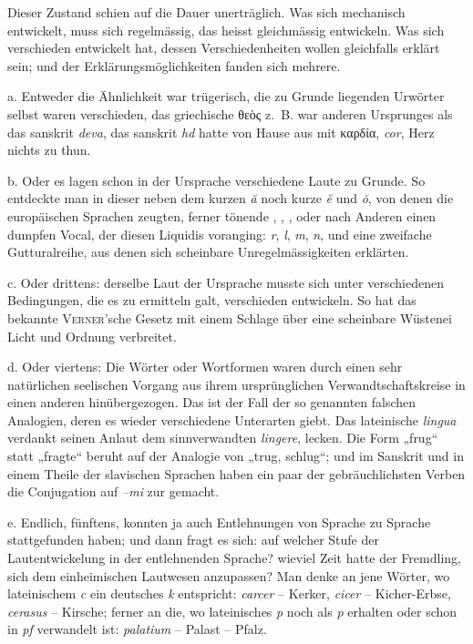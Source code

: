 {Dieser Zustand schien auf die Dauer unerträglich. Was sich mechanisch entwickelt, muss sich regelmässig, das heisst gleichmässig entwickeln. Was sich verschieden entwickelt hat, dessen Verschiedenheiten wollen gleichfalls erklärt sein; und der Erklärungsmöglichkeiten fanden sich mehrere.

\label{III.II.II.2a}a. Entweder die Ähnlichkeit war trügerisch, die zu Grunde liegenden Urwörter selbst waren verschieden, das griechische θεὸς z.~B. war anderen Ursprunges als das sanskrit \textit{deva}, das sanskrit \textit{hd} hatte von Hause aus mit καρδία, \textit{cor}, Herz nichts zu thun.

\label{III.II.II.2b}b. Oder es lagen schon in der Ursprache verschiedene Laute zu Grunde. So entdeckte man in dieser neben dem kurzen \textit{ă} noch kurze \textit{ĕ} und \textit{ŏ}, von denen die europäischen Sprachen zeugten, ferner tönende \textit{}, \textit{}, \textit{}, \textit{} oder nach Anderen einen dumpfen Vocal, der diesen Liquidis voranging: \textit{r}, \textit{l}, \textit{m}, \textit{n}, und eine zweifache Gutturalreihe, aus denen sich scheinbare Unregelmässigkeiten erklärten.

\label{III.II.II.2c}c. Oder drittens: derselbe Laut der Ursprache musste sich unter verschiedenen Bedingungen, die es zu ermitteln galt, verschieden entwickeln. So hat das bekannte \textsc{Verner}’sche Gesetz mit einem Schlage über eine scheinbare Wüstenei Licht und Ordnung verbreitet.

\label{III.II.II.2d}d. Oder viertens: Die Wörter oder Wortformen waren durch einen sehr natürlichen seelischen Vorgang aus ihrem ursprünglichen Verwandtschaftskreise in einen anderen hinübergezogen. Das ist der Fall der so genannten falschen Analogien, deren es wieder verschiedene Unterarten giebt. Das lateinische \textit{lingua} verdankt seinen Anlaut dem sinnverwandten \label{fp.197} \textit{lingere}, lecken. Die Form „frug“ statt „fragte“ beruht auf der Analogie von „trug, schlug“; und im Sanskrit und in einem Theile der slavischen Sprachen haben ein paar der gebräuchlichsten Verben die Conjugation auf \textit{–mi} zur  gemacht.

\label{III.II.II.2e}e. Endlich, fünftens, konnten ja auch Entlehnungen von Sprache zu Sprache stattgefunden haben; und dann fragt es sich: auf welcher Stufe der Lautentwickelung in der entlehnenden Sprache? wieviel Zeit hatte der Fremdling, sich dem einheimischen Lautwesen anzupassen? Man denke an jene Wörter, wo lateinischem \textit{c} ein deutsches \textit{k} entspricht: \textit{carcer} – Kerker, \textit{cicer} – Kicher-Erbse, \textit{cerasus} – Kirsche; ferner an die, wo lateinisches \textit{p} noch als \textit{p} erhalten oder schon in \textit{pf} verwandelt ist: \textit{palatium} – Palast – Pfalz.

}
